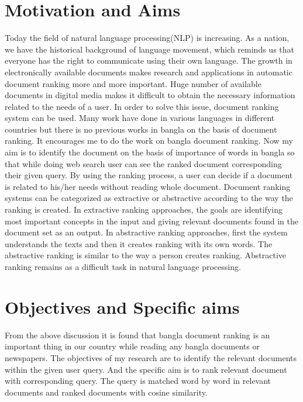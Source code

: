 \section{Motivation and Aims}

Today the field of natural language processing(NLP) is increasing. As a nation, we have the historical background of language movement, which reminds us that everyone has the right to communicate using their own language. The growth in electronically available documents makes research and applications in automatic document ranking more and more important. Huge number of available documents in digital media makes it difficult to obtain the necessary information related to the needs of a user. In order to solve this issue, document ranking system can be used. Many work have done in various languages in different countries but there is no previous works in bangla on the basis of document ranking. It encourages me to do the work on bangla document ranking. Now my aim is to identify the document on the basis of importance of words in bangla so that while doing web search user can see the ranked document corresponding their given query. By using the ranking process, a user can decide if a document is related to his/her needs without reading whole document.
Document ranking systems can be categorized as extractive or abstractive according to the way the ranking is created. In extractive ranking approaches, the goals are identifying most important concepts in the input and giving relevant documents found in the document set as an output.
In abstractive ranking approaches, first the system understands the texts and then it creates ranking with its own words. The abstractive ranking is similar to the way a person creates ranking. Abstractive ranking remains as a difficult task in natural language processing.



\section{Objectives and Specific aims}

From the above discussion it is found that bangla document ranking is an important thing in our country while reading any bangla documents or newspapers. The objectives of my research are to identify the relevant documents within the given user query.
And the specific aim is to rank relevant document with corresponding query. The query is matched word by word in relevant documents and ranked documents with cosine similarity.

